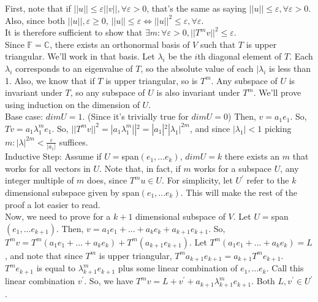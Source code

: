 \documentclass{article}
\begin{document}
First, note that if $||u|| \leq \varepsilon ||v||,  \forall \varepsilon > 0$, that's the same as saying $||u|| \leq \varepsilon,  \forall \varepsilon > 0$. Also, since both $||u||, \varepsilon \geq 0$, $||u|| \leq \varepsilon \iff ||u||^{2} \leq \varepsilon, \forall \varepsilon$.\\

It is therefore sufficient to show that $\exists m: \forall \varepsilon > 0, ||T^{m}v||^{2} \leq \varepsilon$.\\

Since $\mathbb{F} = \mathbb{C}$, there exists an orthonormal basis of $V$ such that $T$ is upper triangular. We'll work in that basis. Let $\lambda_{i}$ be the $i$th diagonal element of $T$. Each $\lambda_{i}$ corresponds to an eigenvalue of $T$, so the absolute value of each $|\lambda_{i}$ is less than 1. Also, we know that if $T$ is upper triangular, so is $T^{m}$. Any subspace of $U$ is invariant under $T$, so any subspace of $U$ is also invariant under $T^{m}$. We'll prove using induction on the dimension of $U$.\\

Base case: $dim U = 1$. (Since it's trivially true for $dim U = 0$) Then, $v = a_{1}e_{1}$. So, $Tv = a_{1}\lambda_{1}^{m}e_{1}$. So, $||T^{m}v||^{2} = |a_{1}\lambda^{m}_{1}||^{2} = |a_{1}|^{2}|\lambda_{1}|^{2m}$, and since $|\lambda_{1}| < 1$ picking $m: |\lambda|^{2m} < \frac{\varepsilon}{|a_{1}|}$ suffices.\\

Inductive Step: Assume if $U =$span$(e_{1}, ... e_{k})$,  $dim U = k$ there exists an $m$ that works for all vectors in $U$. Note that, in fact, if $m$ works for a subspace $U$, any integer multiple of $m$ does, since $T^{m}u \in U$. For simplicity, let $U^{\prime}$ refer to the $k$ dimensional subspace given by span$(e_{1}, ... e_{k})$. This will make the rest of the proof a lot easier to read.\\


Now, we need to prove for a $k+1$ dimensional subspace of $V$. Let $U =$span$(e_{1}, ... e_{k+1})$. Then, $v = a_{1}e_{1} + ... + a_{k}e_{k} + a_{k+1}e_{k+1}$. So, $T^{m}v = T^{m}(a_{1}e_{1} + ... + a_{k}e_{k}) + T^{m}(a_{k+1}e_{k+1})$. Let $T^{m}(a_{1}e_{1} + ... + a_{k}e_{k}) = L$, and note that since $T^{m}$ is upper triangular, $T^{m} a_{k+1}e_{k+1} = a_{k+1}T^{m}e_{k+1}$. $T^{m}e_{k+1}$ is equal to $\lambda^{m}_{k+1}e_{k+1}$ plus some linear combination of $e_{1}, ... e_{k}$. Call this linear combination $v^{\prime}$. So, we have $T^{m}v = L + v^{\prime} + a_{k+1}\lambda^{m}_{k+1}e_{k+1}$. Both $L, v^{\prime} \in U^{\prime}$.\\
\end{document}
